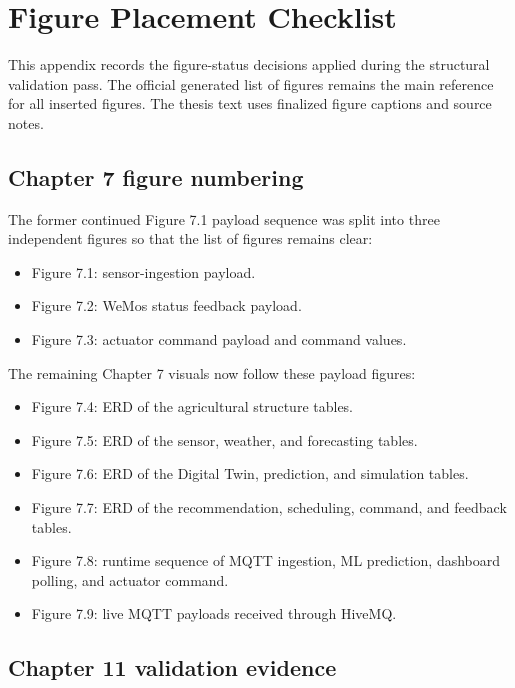 \chapter{Figure Placement Checklist}

This appendix records the figure-status decisions applied during the structural validation pass. The official generated list of figures remains the main reference for all inserted figures. The thesis text uses finalized figure captions and source notes.

\section{Chapter 7 figure numbering}

The former continued Figure 7.1 payload sequence was split into three independent figures so that the list of figures remains clear:

\begin{itemize}
    \item Figure 7.1: sensor-ingestion payload.
    \item Figure 7.2: WeMos status feedback payload.
    \item Figure 7.3: actuator command payload and command values.
\end{itemize}

The remaining Chapter 7 visuals now follow these payload figures:

\begin{itemize}
    \item Figure 7.4: ERD of the agricultural structure tables.
    \item Figure 7.5: ERD of the sensor, weather, and forecasting tables.
    \item Figure 7.6: ERD of the Digital Twin, prediction, and simulation tables.
    \item Figure 7.7: ERD of the recommendation, scheduling, command, and feedback tables.
    \item Figure 7.8: runtime sequence of MQTT ingestion, ML prediction, dashboard polling, and actuator command.
    \item Figure 7.9: live MQTT payloads received through HiveMQ.
\end{itemize}

\section{Chapter 11 validation evidence}

